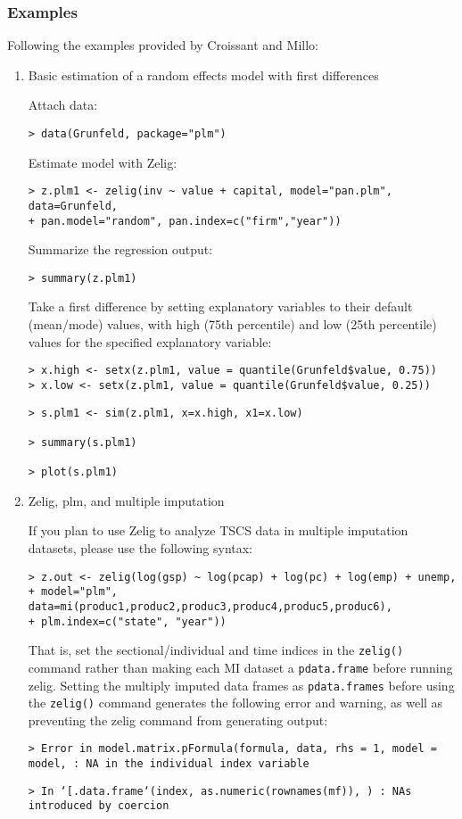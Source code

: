 \subsubsection{Examples}
Following the examples provided by Croissant and Millo:
\begin{enumerate}
\item Basic estimation of a random effects model with first differences

Attach data:

\texttt{> data(Grunfeld, package="plm")}

Estimate model with Zelig:

\begin{verbatim}
> z.plm1 <- zelig(inv ~ value + capital, model="pan.plm", data=Grunfeld, 
+ pan.model="random", pan.index=c("firm","year"))
\end{verbatim}

Summarize the regression output:

\texttt{> summary(z.plm1)}

Take a first difference by setting explanatory variables to their default (mean/mode) values, with high (75th percentile) and low (25th percentile) values for the specified explanatory variable:

\begin{verbatim}
> x.high <- setx(z.plm1, value = quantile(Grunfeld$value, 0.75))
> x.low <- setx(z.plm1, value = quantile(Grunfeld$value, 0.25))
\end{verbatim}

\begin{verbatim}
> s.plm1 <- sim(z.plm1, x=x.high, x1=x.low)

> summary(s.plm1)

> plot(s.plm1)
\end{verbatim}


\item Zelig, plm, and multiple imputation

If you plan to use Zelig to analyze TSCS data in multiple imputation datasets, please use the following syntax:
\begin{verbatim}
> z.out <- zelig(log(gsp) ~ log(pcap) + log(pc) + log(emp) + unemp, 
+ model="plm", data=mi(produc1,produc2,produc3,produc4,produc5,produc6), 
+ plm.index=c("state", "year"))
\end{verbatim}
That is, set the sectional/individual and time indices in the \texttt{zelig()} command rather than making each MI dataset a \texttt{pdata.frame} before running zelig.
Setting the multiply imputed data frames as \texttt{pdata.frames} before using the \texttt{zelig()} command generates the following error and warning, as well as preventing the zelig command from generating output:

\texttt{> Error in model.matrix.pFormula(formula, data, rhs = 1, model = model,  : NA in the individual index variable}
  
\texttt{> In `[.data.frame`(index, as.numeric(rownames(mf)), ) : NAs introduced by coercion}
  
\end{enumerate}


